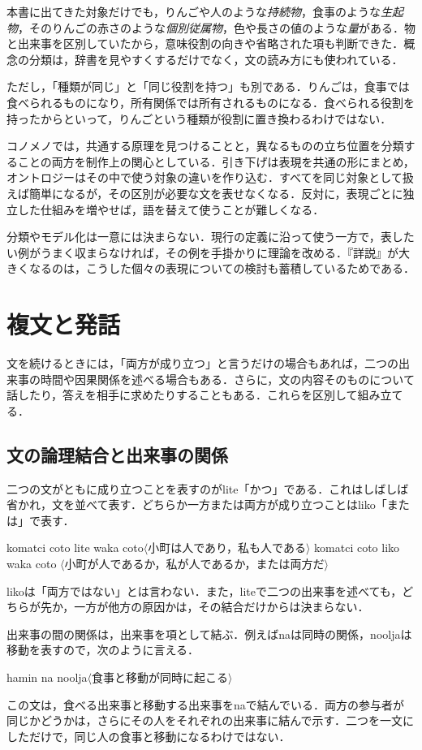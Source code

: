 \documentclass[b5paper, 10pt]{ltjsarticle}
\newcommand{\ko}[1]{\textsf{#1}}
\newcommand{\sentence}[1]{$\langle$#1$\rangle$}
\begin{document}
本書に出てきた対象だけでも，りんごや人のような\emph{持続物}，食事のような\emph{生起物}，そのりんごの赤さのような\emph{個別従属物}，色や長さの値のような\emph{量}がある．物と出来事を区別していたから，意味役割の向きや省略された項も判断できた．概念の分類は，辞書を見やすくするだけでなく，文の読み方にも使われている．

ただし，「種類が同じ」と「同じ役割を持つ」も別である．りんごは，食事では食べられるものになり，所有関係では所有されるものになる．食べられる役割を持ったからといって，りんごという種類が役割に置き換わるわけではない．

コノメノでは，共通する原理を見つけることと，異なるものの立ち位置を分類することの両方を制作上の関心としている．引き下げは表現を共通の形にまとめ，オントロジーはその中で使う対象の違いを作り込む．すべてを同じ対象として扱えば簡単になるが，その区別が必要な文を表せなくなる．反対に，表現ごとに独立した仕組みを増やせば，語を替えて使うことが難しくなる．

分類やモデル化は一意には決まらない．現行の定義に沿って使う一方で，表したい例がうまく収まらなければ，その例を手掛かりに理論を改める．『詳説』が大きくなるのは，こうした個々の表現についての検討も蓄積しているためである．

\section{複文と発話}
文を続けるときには，「両方が成り立つ」と言うだけの場合もあれば，二つの出来事の時間や因果関係を述べる場合もある．さらに，文の内容そのものについて話したり，答えを相手に求めたりすることもある．これらを区別して組み立てる．

\subsection{文の論理結合と出来事の関係}
二つの文がともに成り立つことを表すのが\ko{lite}「かつ」である．これはしばしば省かれ，文を並べて表す．どちらか一方または両方が成り立つことは\ko{liko}「または」で表す．
\begin{exe}
    \ex \ko{komatci coto lite waka coto}\hfill \sentence{小町は人であり，私も人である}
    \ex \ko{komatci coto liko waka coto}
    \glt \sentence{小町が人であるか，私が人であるか，または両方だ}
\end{exe}
\ko{liko}は「両方ではない」とは言わない．また，\ko{lite}で二つの出来事を述べても，どちらが先か，一方が他方の原因かは，その結合だけからは決まらない．

出来事の間の関係は，出来事を項として結ぶ．例えば\ko{na}は同時の関係，\ko{noolja}は移動を表すので，次のように言える．
\begin{exe}
    \ex \ko{hamin na noolja}\hfill \sentence{食事と移動が同時に起こる}
\end{exe}
この文は，食べる出来事と移動する出来事を\ko{na}で結んでいる．両方の参与者が同じかどうかは，さらにその人をそれぞれの出来事に結んで示す．二つを一文にしただけで，同じ人の食事と移動になるわけではない．
\end{document}

